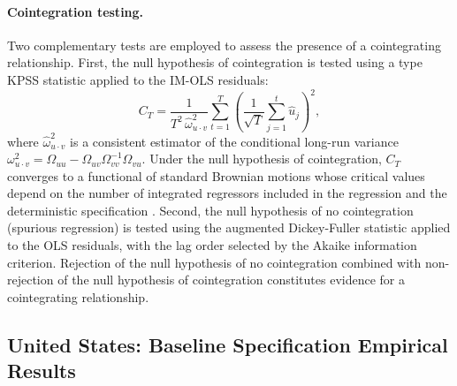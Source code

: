 \paragraph{Cointegration testing.}
Two complementary tests are employed to assess the presence of a
cointegrating relationship. First, the null hypothesis of
cointegration is tested using a \citet{Shin1994} type KPSS statistic
applied to the IM-OLS residuals:
\begin{equation}
	C_T = \frac{1}{T^2\, \hat{\omega}_{u \cdot v}^2}
	\sum_{t=1}^{T}
	\left(\frac{1}{\sqrt{T}} \sum_{j=1}^{t} \hat{u}_j
	\right)^2,
	\label{eq:421:shin_ct}
\end{equation}
where $\hat{\omega}_{u \cdot v}^2$ is a consistent estimator of
the conditional long-run variance $\omega_{u \cdot v}^2
= \Omega_{uu} - \Omega_{uv}\Omega_{vv}^{-1}\Omega_{vu}$. Under
the null hypothesis of cointegration, $C_T$ converges to a
functional of standard Brownian motions whose critical values depend
on the number of integrated regressors included in the regression
and the deterministic specification \citep{Wagner2013}. Second,
the null hypothesis of no cointegration (spurious regression) is
tested using the augmented Dickey-Fuller statistic applied to the
OLS residuals, with the lag order selected by the Akaike
information criterion. Rejection of the null hypothesis of no
cointegration combined with non-rejection of the null hypothesis of
cointegration constitutes evidence for a cointegrating relationship.




\subsection{United States: Baseline Specification Empirical Results}
\label{sec:431:specA_results}

